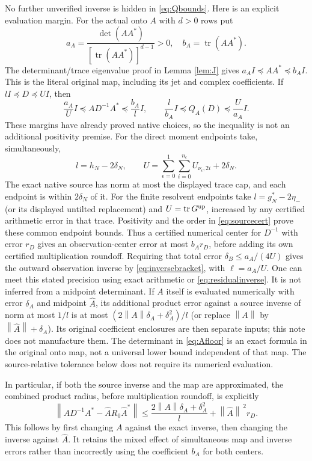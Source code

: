 \documentclass[11pt]{article}
\newcommand{\tr}{\operatorname{tr}}
\newcommand{\norm}[1]{\left\lVert#1\right\rVert}
\begin{document}
No further unverified inverse is hidden in \eqref{eq:Qbounds}.
Here is an explicit evaluation margin. For the actual onto $A$
with $d>0$ rows put
\begin{equation}\label{eq:Afloor}
 a_A=\frac{\det(AA^*)}{[\tr(AA^*)]^{d-1}}>0,
 \quad b_A=\tr(AA^*).
\end{equation}
The determinant/trace eigenvalue proof in Lemma \ref{lem:J}
gives $a_AI\preceq AA^*\preceq b_AI$. This is the literal
original map, including its jet and complex coefficients. If
$lI\preceq D\preceq UI$, then
\begin{equation}\label{eq:obsmargins}
 \frac{a_A}{U}I\preceq AD^{-1}A^*\preceq\frac{b_A}{l}I,
\qquad \frac l{b_A}I\preceq Q_A(D)\preceq\frac U{a_A}I.
\end{equation}
These margins have already proved native choices, so the
inequality is not an additional positivity premise. For the direct
moment endpoints take, simultaneously,
\[
 l=h_N-2\delta_N,\qquad
 U=\sum_{\epsilon=0}^1\sum_{i=0}^{n_\epsilon}
                 U_{\nu_\epsilon,2i}+2\delta_N.
\]
The exact native source has norm at most the displayed trace cap,
and each endpoint is within $2\delta_N$ of it. For the finite
resolvent endpoints take $l=g_N^*-2\eta_-$ (or its displayed
untilted replacement) and $U=\tr G^{\rm up}$, increased by any
certified arithmetic error in that trace. Positivity and the order
in \eqref{eq:sourcecert} prove these common endpoint bounds.
Thus a certified numerical center for $D^{-1}$ with error $r_D$
gives an observation-center error at most $b_Ar_D$, before adding
its own certified multiplication roundoff. Requiring that total
error $\delta_B\le a_A/(4U)$ gives the outward observation
inverse by \eqref{eq:inversebracket}, with $\ell=a_A/U$.
One can meet this stated precision using exact arithmetic or
\eqref{eq:residualinverse}. It is not inferred from a midpoint
determinant. If $A$ itself is evaluated numerically with error
$\delta_A$ and midpoint $\widehat A$, its additional product
error against a source inverse of norm at most $1/l$ is at most
$(2\norm{A}\delta_A+\delta_A^2)/l$ (or replace $\norm{A}$
by $\norm{\widehat A}+\delta_A$). Its original coefficient
enclosures are then separate inputs; this note does not manufacture
them. The determinant in \eqref{eq:Afloor} is an exact formula
in the original onto map, not a universal lower bound independent
of that map. The source-relative tolerance below does not require
its numerical evaluation.

In particular, if both the source inverse and the map are
approximated, the combined product radius, before multiplication
roundoff, is explicitly
\[
 \norm{AD^{-1}A^*-\widehat A R_0\widehat A^*}
 \le \frac{2\norm{A}\delta_A+\delta_A^2}{l}
                  +\norm{\widehat A}^{\,2}r_D.
\]
This follows by first changing $A$ against the exact inverse,
then changing the inverse against $\widehat A$. It retains the
mixed effect of simultaneous map and inverse errors rather than
incorrectly using the coefficient $b_A$ for both centers.
\end{document}
